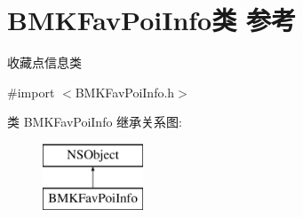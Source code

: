 \hypertarget{interface_b_m_k_fav_poi_info}{}\section{B\+M\+K\+Fav\+Poi\+Info类 参考}
\label{interface_b_m_k_fav_poi_info}


收藏点信息类  




{\ttfamily \#import $<$B\+M\+K\+Fav\+Poi\+Info.\+h$>$}

类 B\+M\+K\+Fav\+Poi\+Info 继承关系图\+:\begin{figure}[H]
\begin{center}
\leavevmode
\includegraphics[height=2.000000cm]{interface_b_m_k_fav_poi_info}
\end{center}
\end{figure}
